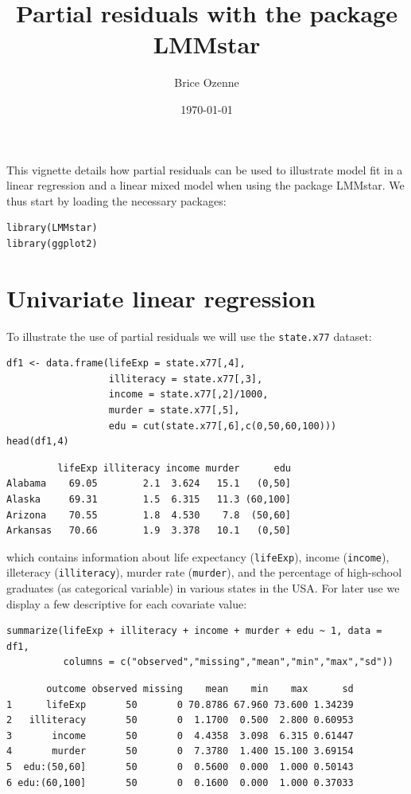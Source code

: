 \documentclass[12pt]{article}
\author{Brice Ozenne}
\date{\today}
\title{Partial residuals with the package LMMstar}
\begin{document}
\maketitle
This vignette details how partial residuals can be used to illustrate
model fit in a linear regression and a linear mixed model when using
the package LMMstar. We thus start by loading the necessary packages:
\lstset{language=r,label= ,caption= ,captionpos=b,numbers=none}
\begin{lstlisting}
library(LMMstar)
library(ggplot2)
\end{lstlisting}


\section{Univariate linear regression}
\label{sec:org5329f14}

To illustrate the use of partial residuals we will use the \texttt{state.x77}
dataset:
\lstset{language=r,label= ,caption= ,captionpos=b,numbers=none}
\begin{lstlisting}
df1 <- data.frame(lifeExp = state.x77[,4],
                  illiteracy = state.x77[,3],
                  income = state.x77[,2]/1000,
                  murder = state.x77[,5],
                  edu = cut(state.x77[,6],c(0,50,60,100)))
head(df1,4)
\end{lstlisting}

\begin{verbatim}
         lifeExp illiteracy income murder      edu
Alabama    69.05        2.1  3.624   15.1   (0,50]
Alaska     69.31        1.5  6.315   11.3 (60,100]
Arizona    70.55        1.8  4.530    7.8  (50,60]
Arkansas   70.66        1.9  3.378   10.1   (0,50]
\end{verbatim}


 which contains information about life expectancy (\texttt{lifeExp}), income
(\texttt{income}), illeteracy (\texttt{illiteracy}), murder rate (\texttt{murder}), and the
percentage of high-school graduates (as categorical variable) in
various states in the USA. For later use we display a few descriptive
for each covariate value:
\lstset{language=r,label= ,caption= ,captionpos=b,numbers=none}
\begin{lstlisting}
summarize(lifeExp + illiteracy + income + murder + edu ~ 1, data = df1,
          columns = c("observed","missing","mean","min","max","sd"))
\end{lstlisting}

\begin{verbatim}
       outcome observed missing    mean    min    max      sd
1      lifeExp       50       0 70.8786 67.960 73.600 1.34239
2   illiteracy       50       0  1.1700  0.500  2.800 0.60953
3       income       50       0  4.4358  3.098  6.315 0.61447
4       murder       50       0  7.3780  1.400 15.100 3.69154
5  edu:(50,60]       50       0  0.5600  0.000  1.000 0.50143
6 edu:(60,100]       50       0  0.1600  0.000  1.000 0.37033
\end{verbatim}
\end{document}
